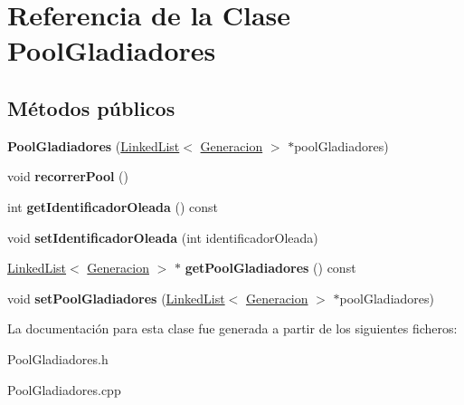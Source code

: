 \hypertarget{classPoolGladiadores}{}\section{Referencia de la Clase Pool\+Gladiadores}
\label{classPoolGladiadores}
\subsection*{Métodos públicos}
\begin{DoxyCompactItemize}
\item 
\mbox{\label{classPoolGladiadores_adfd710acfb17ab6e8d986192bc2490bb}} 
{\bfseries Pool\+Gladiadores} (\hyperlink{classLinkedList}{Linked\+List}$<$ \hyperlink{classGeneracion}{Generacion} $>$ $\ast$pool\+Gladiadores)
\item 
\mbox{\label{classPoolGladiadores_a2b6bb888dea71f5fe9dff32e4234e1e5}} 
void {\bfseries recorrer\+Pool} ()
\item 
\mbox{\label{classPoolGladiadores_a81b9fc24e95d9299fb9418d971a6fb1e}} 
int {\bfseries get\+Identificador\+Oleada} () const
\item 
\mbox{\label{classPoolGladiadores_a5f8cfb5cc547058a37c5b18fa9084056}} 
void {\bfseries set\+Identificador\+Oleada} (int identificador\+Oleada)
\item 
\mbox{\label{classPoolGladiadores_a1d00fce4c20d694a9f6e5bb60b5bf00c}} 
\hyperlink{classLinkedList}{Linked\+List}$<$ \hyperlink{classGeneracion}{Generacion} $>$ $\ast$ {\bfseries get\+Pool\+Gladiadores} () const
\item 
\mbox{\label{classPoolGladiadores_a1a5bdf672666efa1b2b44aa867f71880}} 
void {\bfseries set\+Pool\+Gladiadores} (\hyperlink{classLinkedList}{Linked\+List}$<$ \hyperlink{classGeneracion}{Generacion} $>$ $\ast$pool\+Gladiadores)
\end{DoxyCompactItemize}


La documentación para esta clase fue generada a partir de los siguientes ficheros\+:\begin{DoxyCompactItemize}
\item 
Pool\+Gladiadores.\+h\item 
Pool\+Gladiadores.\+cpp\end{DoxyCompactItemize}
